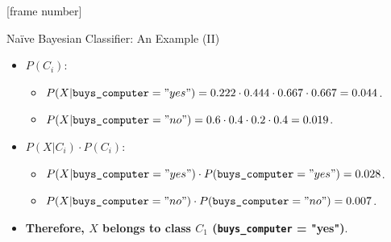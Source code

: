 \documentclass[aspectratio=169,t,table]{beamer}
\begin{document}
  {
    [frame number]
    \begin{frame}{Naïve Bayesian Classifier: An Example (II)}
      \begin{itemize}
        \item $P(C_i)$:
        \begin{itemize}
          \item $P(X | \texttt{buys\_computer} = "yes") = 0.222 \cdot 0.444 \cdot 0.667 \cdot 0.667 = 0.044$.
          \item $P(X | \texttt{buys\_computer} = "no") = 0.6 \cdot 0.4 \cdot 0.2 \cdot 0.4 = 0.019$.
        \end{itemize}
        \item $P(X | C_i) \cdot P(C_i)$:
        \begin{itemize}
          \item $P(X | \texttt{buys\_computer} = "yes") \cdot  P(\texttt{buys\_computer} = "yes") = 0.028$.
          \item $P(X | \texttt{buys\_computer} = "no") \cdot  P(\texttt{buys\_computer} = "no") = 0.007$.
        \end{itemize}
        \item \textbf{Therefore, $X$ belongs to class $C_1$ (\texttt{buys\_computer} = "yes")}.
      \end{itemize}
    \end{frame}
  }
\end{document}
